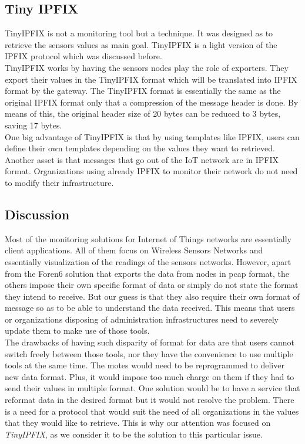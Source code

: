 \subsection{Tiny IPFIX}

TinyIPFIX \cite{schmitt2016tinyipfix} is not a monitoring tool but a technique. It was designed as to retrieve the sensors values as main goal. TinyIPFIX is a light version of the IPFIX protocol which was discussed before.\\

TinyIPFIX works by having the sensors nodes play the role of exporters. They export their values in the TinyIPFIX format which will be translated into IPFIX format by the gateway. The TinyIPFIX format is essentially the same as the original IPFIX format only that a compression of the message header is done. By means of this, the original header size of 20 bytes can be reduced to 3 bytes, saving 17 bytes.\\

One big advantage of TinyIPFIX is that by using templates like IPFIX, users can define their own templates depending on the values they want to retrieved. Another asset is that messages that go out of the IoT network are in IPFIX format. Organizations using already IPFIX to monitor their network do not need to modify their infrastructure.

\subsection{Discussion}

Most of the monitoring solutions for Internet of Things networks are essentially client applications. All of them focus on Wireless Sensors Networks and essentially visualization of the readings of the sensors networks. However, apart from the Foren6 solution that exports the data from nodes in pcap format, the others impose their own specific format of data or simply do not state the format they intend to receive. But our guess is that they also require their own format of message so as to be able to understand the data received. This means that users or organizations disposing of administration infrastructures need to severely update them to make use of those tools. \\

The drawbacks of having such disparity of format for data are that users cannot switch freely between those tools, nor they have the convenience to use multiple tools at the same time. The motes would need to be reprogrammed to deliver new data format. Plus, it would impose too much charge on them if they had to send their values in multiple format. One solution would be to have a service that reformat data in the desired format but it would not resolve the problem. There is a need for a protocol that would suit the need of all organizations in the values that they would like to retrieve. This is why our attention was focused on \textit{TinyIPFIX}, as we consider it to be the solution to this particular issue. \\

